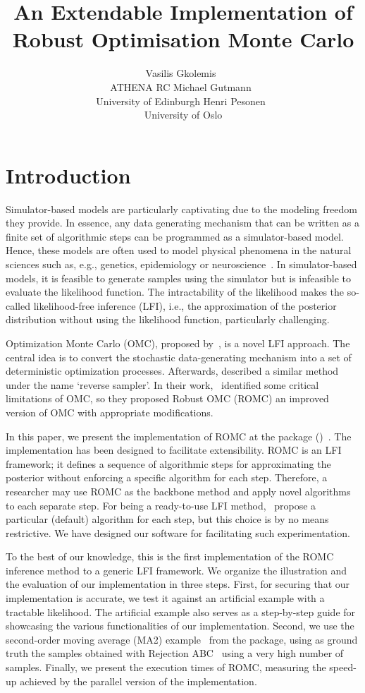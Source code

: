 \documentclass[article, shortnames]{jss}
\author{Vasilis Gkolemis~\orcidlink{0000-0002-2636-0245}\\ATHENA RC \And
  Michael Gutmann~\orcidlink{0000-0002-5329-9910}\\University of Edinburgh \And
  Henri Pesonen~\orcidlink{0000-0003-4500-2926}\\University of Oslo}
\title{An Extendable \proglang{Python} Implementation of Robust Optimisation Monte Carlo}
\begin{document}
\section[Introduction]{Introduction}
\label{sec:intro}

Simulator-based models are particularly captivating due to the
modeling freedom they provide. In essence, any data generating
mechanism that can be written as a finite set of algorithmic steps can
be programmed as a simulator-based model. Hence, these models are
often used to model physical phenomena in the natural sciences such
as, e.g., genetics, epidemiology or neuroscience~\citet{gutmann2016,
  lintusaari2017, sisson2018, cranmer2020}. In simulator-based models,
it is feasible to generate samples using the simulator but is
infeasible to evaluate the likelihood function. The intractability of
the likelihood makes the so-called likelihood-free inference (LFI),
i.e., the approximation of the posterior distribution without using
the likelihood function, particularly challenging.

Optimization Monte Carlo (OMC), proposed by~\citet{Meeds2015}, is a
novel LFI approach. The central idea is to convert the stochastic
data-generating mechanism into a set of deterministic optimization
processes. Afterwards, \citet{Forneron2016} described a similar method
under the name `reverse sampler'. In their work,~\citet{Ikonomov2019}
identified some critical limitations of OMC, so they proposed Robust
OMC (ROMC) an improved version of OMC with appropriate modifications.

In this paper, we present the implementation of ROMC at the
 package  ()~\citet{1708.00707}. The implementation has been designed
to facilitate extensibility. ROMC is an LFI framework; it defines a
sequence of algorithmic steps for approximating the posterior without
enforcing a specific algorithm for each step. Therefore, a researcher
may use ROMC as the backbone method and apply novel algorithms to each
separate step. For being a ready-to-use LFI
method,~\citet{Ikonomov2019} propose a particular (default) algorithm
for each step, but this choice is by no means restrictive. We have
designed our software for facilitating such experimentation.

To the best of our knowledge, this is the first implementation of the
ROMC inference method to a generic LFI framework. We organize the
illustration and the evaluation of our implementation in three
steps. First, for securing that our implementation is accurate, we
test it against an artificial example with a tractable likelihood. The
artificial example also serves as a step-by-step guide for showcasing
the various functionalities of our implementation. Second, we use the
second-order moving average (MA2) example~\citet{Marin2012} from the
 package, using as ground truth the samples obtained with
Rejection ABC~\citet{lintusaari2017} using a very high number of
samples. Finally, we present the execution times of ROMC, measuring
the speed-up achieved by the parallel version of the implementation.
\end{document}
